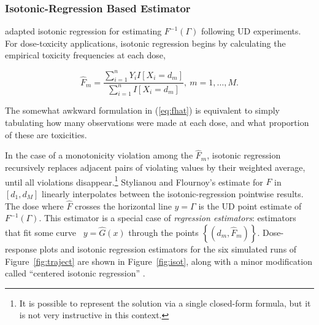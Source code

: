 \subsubsection{Isotonic-Regression Based Estimator}

\citep{Styl:Flou:dose:2002} adapted isotonic regression \citep{BBBB:order:1972} for estimating $F^{-1}(\Gamma)$ following UD experiments. For dose-toxicity applications, isotonic regression begins by calculating the empirical toxicity frequencies at each dose,

\begin{equation}\label{eq:fhat}
\hat{F}_m=\frac{\sum_{i=1}^n Y_iI\left[X_i=d_m\right]}{\sum_{i=1}^n I\left[X_i=d_m\right]},\ m=1,\ldots,M.
\end{equation}

The somewhat awkward formulation in (\ref{eq:fhat}) is equivalent to simply tabulating how many observations were made at each dose, and what proportion of these are toxicities.

In the case of a monotonicity violation among the $\hat{F}_m$, isotonic regression recursively replaces adjacent pairs of violating values by their weighted average, until all violations disappear.\footnote{It is possible to represent the solution via a single closed-form formula, but it is not very instructive in this context.} Stylianou and Flournoy's estimate for $F$ in $[d_1,d_M]$ linearly interpolates between the isotonic-regression pointwise results. The dose where $\hat{F}$ crosses the horizontal line $y=\Gamma$ is the UD point estimate of $F^{-1}(\Gamma)$. This estimator is a special case of \emph{regression estimators}: estimators that fit some curve \ $y=\hat{G}(x)$ through the points $\left\{\left(d_m,\hat{F}_m\right)\right\}$.  Dose-response plots and isotonic regression estimators for the six simulated runs of Figure~\ref{fig:traject} are shown in Figure~\ref{fig:isot}, along with a minor modification called ``centered isotonic regression'' \citep[Section~3.3]{Oron07}.

